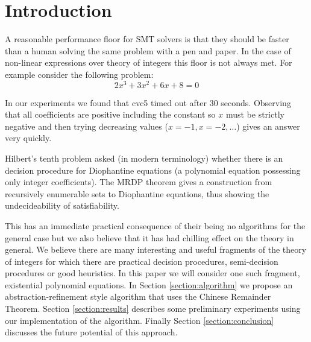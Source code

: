 \section{Introduction}

A reasonable performance floor for SMT solvers is that they should be
faster than a human solving the same problem with a pen and paper.
%
In the case of non-linear expressions over theory of integers this
floor is not always met.
%
For example consider the following problem: 
\[2x^3 + 3x^2 + 6x + 8 = 0\]

In our experiments we found that cvc5 timed out after 30 
seconds.
Observing that all coefficients are positive including the
constant so $x$ must be strictly negative and then trying decreasing
values ($x = -1, x = -2, \dots$) gives an answer very quickly.

Hilbert's tenth problem asked (in modern terminology) whether 
there is an decision procedure for Diophantine equations 
(a polynomial equation possessing only integer coefficients).
%
The MRDP theorem gives a construction from recursively enumerable sets
to Diophantine equations, thus showing the undecideability of satisfiability.

This has an immediate practical consequence of their being no
algorithms for the general case but we also believe that it has had
chilling effect on the theory in general.
%
We believe there are many interesting and useful fragments of the
theory of integers for which there are practical decision procedures,
semi-decision procedures or good heuristics.
In this paper we will consider one such fragment, existential
polynomial equations.
%
In Section \ref{section:algorithm} we propose an
abstraction-refinement style algorithm that uses the Chinese Remainder
Theorem.
Section \ref{section:results} describes some preliminary experiments
using our implementation of the algorithm.
Finally Section \ref{section:conclusion} discusses the future
potential of this approach.
